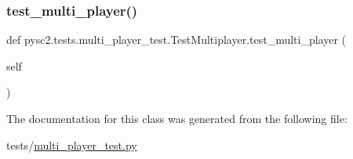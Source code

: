 \subsubsection{\texorpdfstring{test\+\_\+multi\+\_\+player()}{test\_multi\_player()}}
{\footnotesize\ttfamily def pysc2.\+tests.\+multi\+\_\+player\+\_\+test.\+Test\+Multiplayer.\+test\+\_\+multi\+\_\+player (\begin{DoxyParamCaption}\item[{}]{self }\end{DoxyParamCaption})}



The documentation for this class was generated from the following file\+:\begin{DoxyCompactItemize}
\item 
tests/\mbox{\hyperlink{multi__player__test_8py}{multi\+\_\+player\+\_\+test.\+py}}\end{DoxyCompactItemize}
